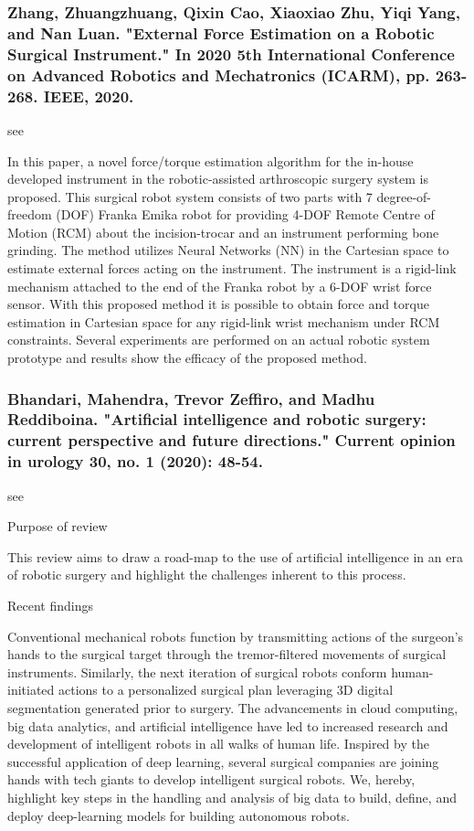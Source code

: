 \documentclass[conference]{IEEEtran}
\begin{document}
\medskip
\subsubsection{Zhang, Zhuangzhuang, Qixin Cao, Xiaoxiao Zhu, Yiqi Yang, and Nan Luan. "External Force Estimation on a Robotic Surgical Instrument." In 2020 5th International Conference on Advanced Robotics and Mechatronics (ICARM), pp. 263-268. IEEE, 2020.}
see \cite{zhang2020external}

In this paper, a novel force/torque estimation algorithm for the in-house developed instrument in the robotic-assisted arthroscopic surgery system is proposed. This surgical robot system consists of two parts with 7 degree-of-freedom (DOF) Franka Emika robot for providing 4-DOF Remote Centre of Motion (RCM) about the incision-trocar and an instrument performing bone grinding. The method utilizes Neural Networks (NN) in the Cartesian space to estimate external forces acting on the instrument. The instrument is a rigid-link mechanism attached to the end of the Franka robot by a 6-DOF wrist force sensor. With this proposed method it is possible to obtain force and torque estimation in Cartesian space for any rigid-link wrist mechanism under RCM constraints. Several experiments are performed on an actual robotic system prototype and results show the efficacy of the proposed method.

\medskip
\subsubsection{Bhandari, Mahendra, Trevor Zeffiro, and Madhu Reddiboina. "Artificial intelligence and robotic surgery: current perspective and future directions." Current opinion in urology 30, no. 1 (2020): 48-54.}
see \cite{bhandari2020artificial}

Purpose of review 

This review aims to draw a road-map to the use of artificial intelligence in an era of robotic surgery and highlight the challenges inherent to this process.

Recent findings 

Conventional mechanical robots function by transmitting actions of the surgeon's hands to the surgical target through the tremor-filtered movements of surgical instruments. Similarly, the next iteration of surgical robots conform human-initiated actions to a personalized surgical plan leveraging 3D digital segmentation generated prior to surgery. The advancements in cloud computing, big data analytics, and artificial intelligence have led to increased research and development of intelligent robots in all walks of human life. Inspired by the successful application of deep learning, several surgical companies are joining hands with tech giants to develop intelligent surgical robots. We, hereby, highlight key steps in the handling and analysis of big data to build, define, and deploy deep-learning models for building autonomous robots.
\end{document}
